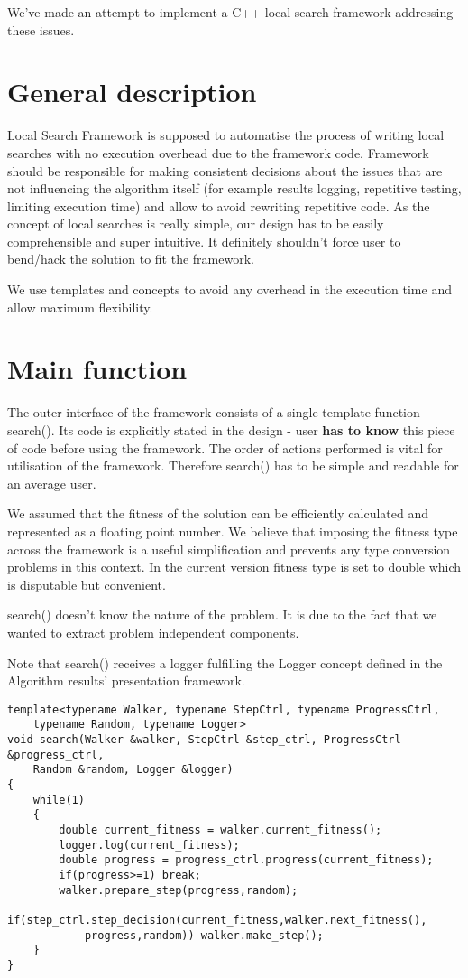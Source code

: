 We've made an attempt to implement a C++ local search 
framework addressing these issues.

\section{General description}

Local Search Framework is supposed to automatise the process of writing local searches with no execution overhead due to the framework code.
Framework should be responsible for making consistent decisions about the issues that are not influencing the algorithm itself
(for example results logging, repetitive testing, limiting execution time) and allow to avoid rewriting repetitive code.
As the concept of local searches is really simple, our design has to be easily comprehensible and super intuitive.
It definitely shouldn't force user to bend/hack the solution to fit the framework.

We use templates and concepts to avoid any overhead in the execution time and allow maximum flexibility.

\section{Main function}

The outer interface of the framework consists of a single template function search().
Its code is explicitly stated in the design - user {\bf has to know} this piece of code before using the framework.
The order of actions performed is vital for utilisation of the framework.
Therefore search() has to be simple and readable for an average user.

We assumed that the fitness of the solution can be efficiently calculated and represented as a floating point number.
We believe that imposing the fitness type across the framework is a useful simplification and prevents any type
conversion problems in this context. In the current version fitness type is set to double which is disputable but convenient.

search() doesn't know the nature of the problem.
It is due to the fact that we wanted to extract problem independent components.

Note that search() receives a logger fulfilling the Logger concept defined in the Algorithm
results' presentation framework.


\begin{lstlisting}
template<typename Walker, typename StepCtrl, typename ProgressCtrl,
	typename Random, typename Logger>
void search(Walker &walker, StepCtrl &step_ctrl, ProgressCtrl &progress_ctrl,
	Random &random, Logger &logger)
{
	while(1)
	{
		double current_fitness = walker.current_fitness();
		logger.log(current_fitness);
		double progress = progress_ctrl.progress(current_fitness);
		if(progress>=1) break;
		walker.prepare_step(progress,random);
		if(step_ctrl.step_decision(current_fitness,walker.next_fitness(),
			progress,random)) walker.make_step();
	}
}
\end{lstlisting}

